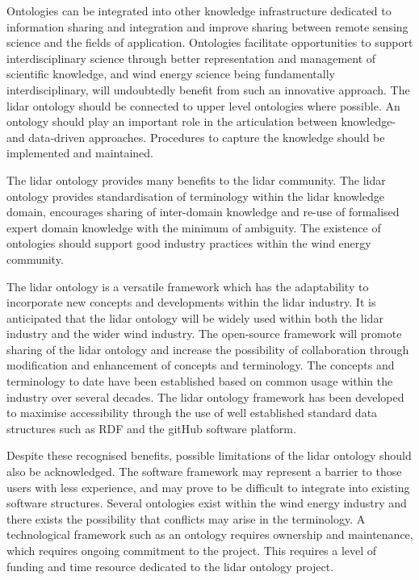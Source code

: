 \documentclass[remotesensing,article,submit,pdftex,moreauthors]{Definitions/mdpi}
\begin{document}
Ontologies can be integrated into other knowledge infrastructure dedicated to information sharing and integration and improve sharing between remote sensing science and the fields of application. Ontologies facilitate opportunities to support interdisciplinary science through better representation and management of scientific knowledge, and wind energy science being fundamentally interdisciplinary, will undoubtedly benefit from such an innovative approach.
The lidar ontology should be connected to upper level ontologies where possible.
An ontology should play an important role in the articulation between knowledge- and data-driven approaches.
Procedures to capture the knowledge should be implemented and maintained. 

The lidar ontology provides many benefits to the lidar community.
The lidar ontology provides standardisation of terminology within the lidar knowledge domain, encourages sharing of inter-domain knowledge and re-use of formalised expert domain knowledge with the minimum of ambiguity. The existence of ontologies should support good industry practices within the wind energy community.

The lidar ontology is a versatile framework which has the adaptability to incorporate new concepts and developments within the lidar industry.
It is anticipated that the lidar ontology will be widely used within both the lidar industry and the wider wind industry.
The open-source framework will promote sharing of the lidar ontology and increase the possibility of collaboration through modification and enhancement of concepts and terminology. 
The concepts and terminology to date have been established based on common usage within the industry over several decades.
The lidar ontology framework has been developed to maximise accessibility through the use of well established standard data structures such as RDF and the gitHub software platform.

Despite these recognised benefits, possible limitations of the lidar ontology should also be acknowledged.
The software framework may represent a barrier to those users with less experience, and may prove to be difficult to integrate into existing software structures.
Several ontologies exist within the wind energy industry and there exists the possibility that conflicts may arise in the terminology.
A technological framework such as an ontology requires ownership and maintenance, which requires ongoing commitment to the project.
This requires a level of funding and time resource dedicated to the lidar ontology project. 
\end{document}
